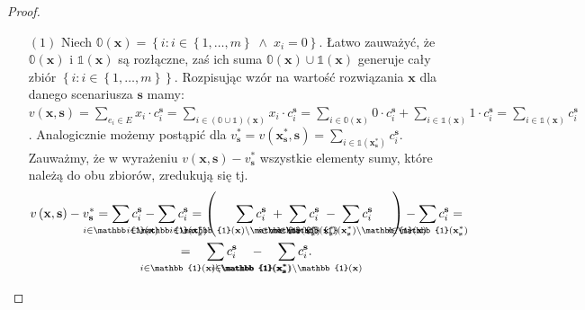 \begin{proof}
	\begin{itemize}
		\item[$\left( 1 \right)$] Niech $\mathbb{0} \left( \textbf{x} \right) = \left\{ i : i \in \left\{ 1, \dots, m \right\} \; \wedge \; x_{i} = 0 \right\}$. Łatwo zauważyć, że $\mathbb{0} \left( \textbf{x} \right)$ i $\mathbb{1} \left( \textbf{x} \right)$ są rozłączne, zaś ich suma $\mathbb{0} \left( \textbf{x} \right) \cup \mathbb{1} \left( \textbf{x} \right)$ generuje cały zbiór $\left\{ i : i \in \left\{ 1, \dots, m \right\} \right\}$. Rozpisując wzór na wartość rozwiązania $\textbf{x}$ dla danego scenariusza $\textbf{s}$ mamy: $v \left( \textbf{x}, \textbf{s} \right) = \sum_{e_{i} \in E} x_{i} \cdot c^{\textbf{s}}_{i} = \sum_{i \in \left( \mathbb{0} \cup \mathbb{1} \right) \left( \textbf{x} \right)} x_{i} \cdot c^{\textbf{s}}_{i} = \sum_{i \in \mathbb{0} \left( \textbf{x} \right)} 0 \cdot c^{\textbf{s}}_{i} + \sum_{i \in \mathbb{1} \left( \textbf{x} \right)} 1 \cdot c^{\textbf{s}}_{i} = \sum_{i \in \mathbb{1} \left( \textbf{x} \right)} c^{\textbf{s}}_{i}$. Analogicznie możemy postąpić dla $v^{\ast}_{\textbf{s}} = v \left( \textbf{x}^{\ast}_{\textbf{s}}, \textbf{s} \right) = \sum_{i \in \mathbb{1} \left( \textbf{x}^{\ast}_{\textbf{s}} \right)} c^{\textbf{s}}_{i}$. Zauważmy, że w wyrażeniu $v \left( \textbf{x}, \textbf{s} \right) - v^{\ast}_{\textbf{s}}$ wszystkie elementy sumy, które należą do obu zbiorów, zredukują się tj.
		\begin{gather*}
			v \left( \textbf{x}, \textbf{s} \right) - v^{\ast}_{\textbf{s}} = \sum_{\mathclap{i \in \mathbb{1} \left( \textbf{x} \right)}} c^{\textbf{s}}_{i} - \sum_{\mathclap{i \in \mathbb{1} \left( \textbf{x}^{\ast}_{\textbf{s}} \right)}} c^{\textbf{s}}_{i} = \left( \quad \; \; \sum_{\mathclap{i \in \mathbb{1} \left( \textbf{x} \right) \setminus \mathbb{1} \left( \textbf{x}^{\ast}_{\textbf{s}} \right) }} c^{\textbf{s}}_{i} \; + \; \sum_{\mathclap{i \in \mathbb{1} \left( \textbf{x}^{\ast}_{\textbf{s}} \right) }} c^{\textbf{s}}_{i} \; - \; \sum_{\mathclap{i \in \mathbb{1} \left( \textbf{x}^{\ast}_{\textbf{s}} \right) \setminus \mathbb{1} \left( \textbf{x} \right) }} c^{\textbf{s}}_{i} \quad \; \; \right) - \sum_{\mathclap{i \in \mathbb{1} \left( \textbf{x}^{\ast}_{\textbf{s}} \right) }} c^{\textbf{s}}_{i} = \\ = \quad \sum_{\mathclap{i \in \mathbb{1} \left( \textbf{x} \right) \setminus \mathbb{1} \left( \textbf{x}^{\ast}_{\textbf{s}} \right) }} c^{\textbf{s}}_{i} \quad - \quad \sum_{\mathclap{i \in \mathbb{1} \left( \textbf{x}^{\ast}_{\textbf{s}} \right) \setminus \mathbb{1} \left( \textbf{x} \right) }} c^{\textbf{s}}_{i}\text{.}

\end{gather*}
\end{itemize}
\end{proof}
